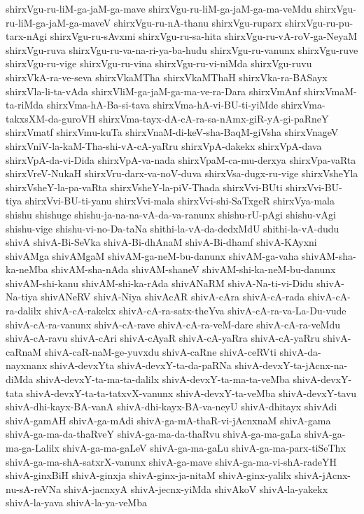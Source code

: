 {shirxVgu-ru-liM-ga-jaM-ga-mave
shirxVgu-ru-liM-ga-jaM-ga-ma-veMdu
shirxVgu-ru-liM-ga-jaM-ga-maveV
shirxVgu-ru-nA-thanu
shirxVgu-ruparx
shirxVgu-ru-pu-tarx-nAgi
shirxVgu-ru-sAvxmi
shirxVgu-ru-sa-hita
shirxVgu-ru-vA-roV-ga-NeyaM
shirxVgu-ruva
shirxVgu-ru-va-na-ri-ya-ba-hudu
shirxVgu-ru-vanunx
shirxVgu-ruve
shirxVgu-ru-vige
shirxVgu-ru-vina
shirxVgu-ru-vi-niMda
shirxVgu-ruvu
shirxVkA-ra-ve-seva
shirxVkaMTha
shirxVkaMThaH
shirxVka-ra-BASayx
shirxVla-li-ta-vAda
shirxVliM-ga-jaM-ga-ma-ve-ra-Dara
shirxVmAnf
shirxVmaM-ta-riMda
shirxVma-hA-Ba-si-tava
shirxVma-hA-vi-BU-ti-yiMde
shirxVma-takxsXM-da-guroVH
shirxVma-tayx-dA-cA-ra-sa-nAmx-giR-yA-gi-paRneY
shirxVmatf
shirxVmu-kuTa
shirxVnaM-di-keV-sha-BaqM-giVsha
shirxVnageV
shirxVniV-la-kaM-Tha-shi-vA-cA-yaRru
shirxVpA-dakekx
shirxVpA-dava
shirxVpA-da-vi-Dida
shirxVpA-va-nada
shirxVpaM-ca-mu-derxya
shirxVpa-vaRta
shirxVreV-NukaH
shirxVru-darx-va-noV-duva
shirxVsa-dugx-ru-vige
shirxVsheYla
shirxVsheY-la-pa-vaRta
shirxVsheY-la-piV-Thada
shirxVvi-BUti
shirxVvi-BU-tiya
shirxVvi-BU-ti-yanu
shirxVvi-mala
shirxVvi-shi-SaTxgeR
shirxVya-mala
shishu
shishuge
shishu-ja-na-na-vA-da-va-ranunx
shishu-rU-pAgi
shishu-vAgi
shishu-vige
shishu-vi-no-Da-taNa
shithi-la-vA-da-dedxMdU
shithi-la-vA-dudu
shivA
shivA-Bi-SeVka
shivA-Bi-dhAnaM
shivA-Bi-dhamf
shivA-KAyxni
shivAMga
shivAMgaM
shivAM-ga-neM-bu-danunx
shivAM-ga-vaha
shivAM-sha-ka-neMba
shivAM-sha-nAda
shivAM-shaneV
shivAM-shi-ka-neM-bu-danunx
shivAM-shi-kanu
shivAM-shi-ka-rAda
shivANaRM
shivA-Na-ti-vi-Didu
shivA-Na-tiya
shivANeRV
shivA-Niya
shivAcAR
shivA-cAra
shivA-cA-rada
shivA-cA-ra-dalilx
shivA-cA-rakekx
shivA-cA-ra-satx-theYva
shivA-cA-ra-va-La-Du-vude
shivA-cA-ra-vanunx
shivA-cA-rave
shivA-cA-ra-veM-dare
shivA-cA-ra-veMdu
shivA-cA-ravu
shivA-cAri
shivA-cAyaR
shivA-cA-yaRra
shivA-cA-yaRru
shivA-caRnaM
shivA-caR-naM-ge-yuvxdu
shivA-caRne
shivA-ceRVti
shivA-da-nayxnanx
shivA-devxYta
shivA-devxY-ta-da-paRNa
shivA-devxY-ta-jAcnx-na-diMda
shivA-devxY-ta-ma-ta-dalilx
shivA-devxY-ta-ma-ta-veMba
shivA-devxY-tata
shivA-devxY-ta-ta-tatxvX-vanunx
shivA-devxY-ta-veMba
shivA-devxY-tavu
shivA-dhi-kayx-BA-vanA
shivA-dhi-kayx-BA-va-neyU
shivA-dhitayx
shivAdi
shivA-gamAH
shivA-ga-mAdi
shivA-ga-mA-thaR-vi-jAcnxnaM
shivA-gama
shivA-ga-ma-da-thaRveY
shivA-ga-ma-da-thaRvu
shivA-ga-ma-gaLa
shivA-ga-ma-ga-Lalilx
shivA-ga-ma-gaLeV
shivA-ga-ma-gaLu
shivA-ga-ma-parx-tiSeThx
shivA-ga-ma-shA-satxrX-vanunx
shivA-ga-mave
shivA-ga-ma-vi-shA-radeYH
shivA-ginxBiH
shivA-ginxja
shivA-ginx-ja-nitaM
shivA-ginx-yalilx
shivA-jAcnx-nu-sA-reVNa
shivA-jacnxyA
shivA-jecnx-yiMda
shivAkoV
shivA-la-yakekx
shivA-la-yava
shivA-la-ya-veMba
}
